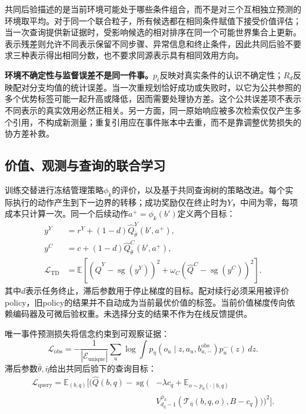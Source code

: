 \documentclass[sigconf,anonymous,review]{acmart}
\DeclareMathOperator{\sg}{sg}
\newcommand{\E}{\mathbb{E}}
\theoremstyle{zhplain}
\begin{document}
共同后验描述的是当前环境可能处于哪些条件组合，而不是对三个互相独立预测的环境取平均。对于同一个联合粒子，所有候选都在相同条件赋值下接受价值评估；当一次查询提供新证据时，受影响候选的相对排序在同一个可能世界集合上更新。表示残差则允许不同表示保留不同步骤、异常信息和终止条件，因此共同后验不要求三种表示得出相同分数，也不要求同源表示具有相同效用方向。

\textbf{环境不确定性与监督误差不是同一件事。}\(p_t\)反映对真实条件的认识不确定性；\(R_d\)反映配对分支均值的统计误差。当一次重规划恰好成功或失败时，以它为公共参照的多个优势标签可能一起升高或降低，因而需要处理协方差。这个公共误差项不表示不同表示的真实效用必然正相关。另一方面，同一原始响应被多次检索仅仅产生多个引用，不构成新测量；重复引用应在事件账本中去重，而不是靠调整优势损失的协方差补救。

\subsection{价值、观测与查询的联合学习}
训练交替进行冻结管理策略\(\phi_k\)的评价，以及基于共同查询树的策略改进。每个实际执行的动作产生到下一边界的转移；成功奖励仅在终止时为\(Y\)，中间为零，每项成本只计算一次。同一个后续动作\(a^+=\phi_k(b')\)定义两个目标：
\begin{equation}
\begin{aligned}
y^Y&=r^Y+(1-d)\hat Q_{\bar\theta}^Y(b',a^+),\\
y^C&=c+(1-d)\hat Q_{\bar\theta}^C(b',a^+),\\
\mathcal L_{\mathrm{TD}}&=\E[(\hat Q^Y-\sg(y^Y))^2+\omega_C(\hat Q^C-\sg(y^C))^2].
\end{aligned}
\label{eq:td}
\end{equation}
其中\(d\)表示任务终止，滞后参数用于停止梯度的目标。配对续行必须采用被评价policy，旧policy的结果并不自动成为当前最优价值的标签。当前价值梯度传向依赖编码器及可微后验权重。未选择分支的结果不作为在线反馈提供。

唯一事件预测损失将信念约束到可观察证据：
\begin{equation}
\mathcal L_{\mathrm{obs}}=-\frac1{|\mathcal E_{\mathrm{unique}}|}\sum_u
\log\!\int p_\eta(o_u\mid z,a_u,b_{u,-}^{\mathrm{obs}})p_u^-(z)\,dz.
\label{eq:obs}
\end{equation}
滞后参数\(\bar\theta,\bar\eta\)给出共同后验下的查询目标：
\begin{equation}
\begin{aligned}
\mathcal L_{\mathrm{query}}=\E_{(b,q)}\Big[\big(\hat Q(b,q)-\sg\big(&-\lambda c_q+\E_{o\sim p_{\bar\eta}(\cdot\mid b,q)}\\
&V_{d_q-1}^{\phi_k}(\mathcal T_{\bar\eta}(b,q,o),B-c_q)\big)\big)^2\Big].
\end{aligned}
\label{eq:queryconsistency}
\end{equation}
\end{document}
